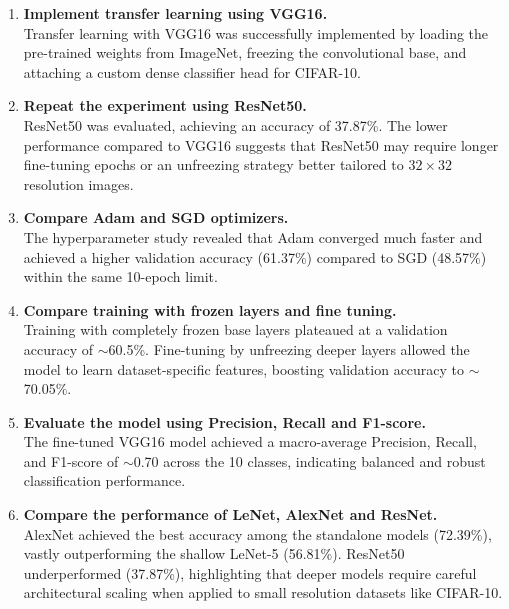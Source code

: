 \documentclass[11pt]{article}
\begin{document}
\begin{enumerate}
\item \textbf{Implement transfer learning using VGG16.}\\
Transfer learning with VGG16 was successfully implemented by loading the pre-trained weights from ImageNet, freezing the convolutional base, and attaching a custom dense classifier head for CIFAR-10.

\item \textbf{Repeat the experiment using ResNet50.}\\
ResNet50 was evaluated, achieving an accuracy of 37.87\%. The lower performance compared to VGG16 suggests that ResNet50 may require longer fine-tuning epochs or an unfreezing strategy better tailored to $32\times32$ resolution images.

\item \textbf{Compare Adam and SGD optimizers.}\\
The hyperparameter study revealed that Adam converged much faster and achieved a higher validation accuracy (61.37\%) compared to SGD (48.57\%) within the same 10-epoch limit.

\item \textbf{Compare training with frozen layers and fine tuning.}\\
Training with completely frozen base layers plateaued at a validation accuracy of $\sim$60.5\%. Fine-tuning by unfreezing deeper layers allowed the model to learn dataset-specific features, boosting validation accuracy to $\sim$70.05\%.

\item \textbf{Evaluate the model using Precision, Recall and F1-score.}\\
The fine-tuned VGG16 model achieved a macro-average Precision, Recall, and F1-score of $\sim$0.70 across the 10 classes, indicating balanced and robust classification performance.

\item \textbf{Compare the performance of LeNet, AlexNet and ResNet.}\\
AlexNet achieved the best accuracy among the standalone models (72.39\%), vastly outperforming the shallow LeNet-5 (56.81\%). ResNet50 underperformed (37.87\%), highlighting that deeper models require careful architectural scaling when applied to small resolution datasets like CIFAR-10.

\end{enumerate}

\end{document}

